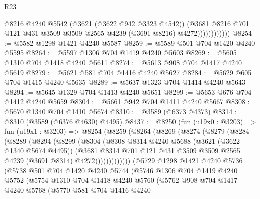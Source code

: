 \begin{lexlean}{R23}
\begin{coremodule}
                          @8216
                          @4240
                          @5542
                          (@3621 (@3622 @942 @3323 @4542))
                          (@3681
                            @8216
                            @701
                            @121
                            @431
                            @3509
                            @3509
                            @2565
                            @4239
                            (@3691 @8216)
                            @4272))))))))))))
@8254 := @5582 @1298 @1421 @4240 @5587
@8259 := @5589 @501 @704 @1420 @4240 @5595
@8264 := @5597 @1306 @704 @1419 @4240 @5603
@8269 := @5605 @1310 @704 @1418 @4240 @5611
@8274 := @5613 @908 @704 @1417 @4240 @5619
@8279 := @5621 @581 @704 @1416 @4240 @5627
@8284 := @5629 @605 @704 @1415 @4240 @5635
@8289 := @5637 @1323 @704 @1414 @4240 @5643
@8294 := @5645 @1329 @704 @1413 @4240 @5651
@8299 := @5653 @676 @704 @1412 @4240 @5659
@8304 := @5661 @942 @704 @1411 @4240 @5667
@8308 := @5670 @1340 @704 @1410 @5674
@8310 := @3589 (@6373 @4373)
@8314 := @8310 (@3589 (@6376 @4630) @4495)
@8437 := @8250
    (fun (u19x0 : @3203) =>
    fun (u19x1 : @3203) =>
    @8254
      (@8259
        (@8264
          (@8269
            (@8274
              (@8279
                (@8284
                  (@8289
                    (@8294
                      (@8299
                        (@8304
                          (@8308
                            @8314
                            @4240
                            @5688
                            (@3621 (@3622 @1340 @5674 @4495))
                            (@3681
                              @8314
                              @701
                              @121
                              @431
                              @3509
                              @3509
                              @2565
                              @4239
                              (@3691 @8314)
                              @4272)))))))))))))
    (@5729
      @1298
      @1421
      @4240
      @5736
      (@5738
        @501
        @704
        @1420
        @4240
        @5744
        (@5746
          @1306
          @704
          @1419
          @4240
          @5752
          (@5754
            @1310
            @704
            @1418
            @4240
            @5760
            (@5762
              @908
              @704
              @1417
              @4240
              @5768
              (@5770
                @581
                @704
                @1416
                @4240

\end{coremodule}
\end{lexlean}
